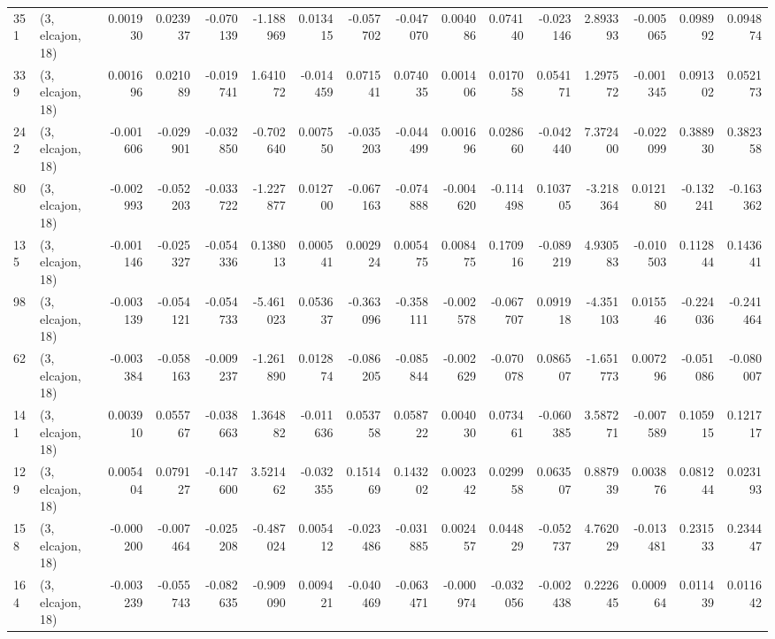 \begin{tabular}{llrrrrrrrrrrrrrr}
351 &  (3, elcajon, 18) &   0.001930 &  0.023937 & -0.070139 &   -1.188969 &  0.013415 &  -0.057702 & -0.047070 &  0.004086 &  0.074140 & -0.023146 &    2.893393 & -0.005065 &  0.098992 &  0.094874 \\
339 &  (3, elcajon, 18) &   0.001696 &  0.021089 & -0.019741 &    1.641072 & -0.014459 &   0.071541 &  0.074035 &  0.001406 &  0.017058 &  0.054171 &    1.297572 & -0.001345 &  0.091302 &  0.052173 \\
242 &  (3, elcajon, 18) &  -0.001606 & -0.029901 & -0.032850 &   -0.702640 &  0.007550 &  -0.035203 & -0.044499 &  0.001696 &  0.028660 & -0.042440 &    7.372400 & -0.022099 &  0.388930 &  0.382358 \\
80  &  (3, elcajon, 18) &  -0.002993 & -0.052203 & -0.033722 &   -1.227877 &  0.012700 &  -0.067163 & -0.074888 & -0.004620 & -0.114498 &  0.103705 &   -3.218364 &  0.012180 & -0.132241 & -0.163362 \\
135 &  (3, elcajon, 18) &  -0.001146 & -0.025327 & -0.054336 &    0.138013 &  0.000541 &   0.002924 &  0.005475 &  0.008475 &  0.170916 & -0.089219 &    4.930583 & -0.010503 &  0.112844 &  0.143641 \\
98  &  (3, elcajon, 18) &  -0.003139 & -0.054121 & -0.054733 &   -5.461023 &  0.053637 &  -0.363096 & -0.358111 & -0.002578 & -0.067707 &  0.091918 &   -4.351103 &  0.015546 & -0.224036 & -0.241464 \\
62  &  (3, elcajon, 18) &  -0.003384 & -0.058163 & -0.009237 &   -1.261890 &  0.012874 &  -0.086205 & -0.085844 & -0.002629 & -0.070078 &  0.086507 &   -1.651773 &  0.007296 & -0.051086 & -0.080007 \\
141 &  (3, elcajon, 18) &   0.003910 &  0.055767 & -0.038663 &    1.364882 & -0.011636 &   0.053758 &  0.058722 &  0.004030 &  0.073461 & -0.060385 &    3.587271 & -0.007589 &  0.105915 &  0.121717 \\
129 &  (3, elcajon, 18) &   0.005404 &  0.079127 & -0.147600 &    3.521462 & -0.032355 &   0.151469 &  0.143202 &  0.002342 &  0.029958 &  0.063507 &    0.887939 &  0.003876 &  0.081244 &  0.023193 \\
158 &  (3, elcajon, 18) &  -0.000200 & -0.007464 & -0.025208 &   -0.487024 &  0.005412 &  -0.023486 & -0.031885 &  0.002457 &  0.044829 & -0.052737 &    4.762029 & -0.013481 &  0.231533 &  0.234447 \\
164 &  (3, elcajon, 18) &  -0.003239 & -0.055743 & -0.082635 &   -0.909090 &  0.009421 &  -0.040469 & -0.063471 & -0.000974 & -0.032056 & -0.002438 &    0.222645 &  0.000964 &  0.011439 &  0.011642 \\

\end{tabular}
